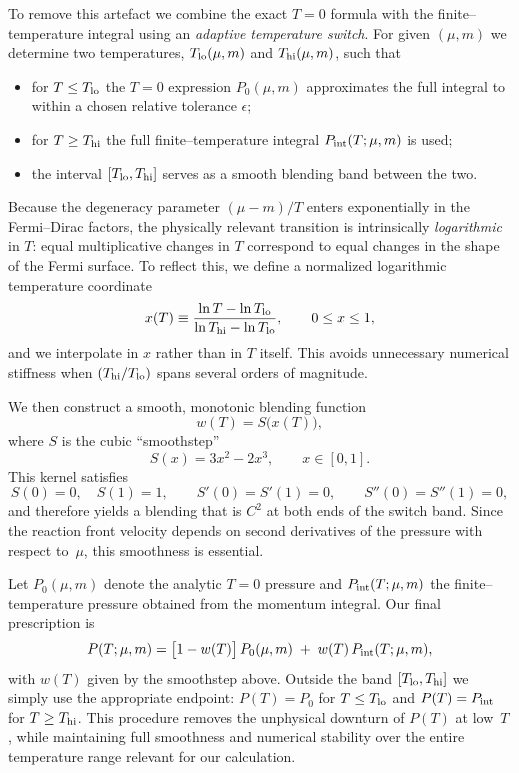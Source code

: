 \documentclass[superscriptaddress,amsmath,floatfix,aps,prc,twocolumn]{revtex4-1}
\begin{document}
To remove this artefact we combine the exact $T=0$ formula with the
finite--temperature integral using an \emph{adaptive temperature
switch}.  For given $(\mu,m)$ we determine two temperatures,
$T_{\rm lo}(\mu,m)$ and $T_{\rm hi}(\mu,m)$, such that
\begin{itemize}
  \item for $T \leq T_{\rm lo}$ the $T=0$ expression $P_0(\mu,m)$
        approximates the full integral to within a chosen relative
        tolerance $\epsilon$;
  \item for $T \geq T_{\rm hi}$ the full finite--temperature integral
        $P_{\rm int}(T;\mu,m)$ is used;
  \item the interval $[T_{\rm lo},T_{\rm hi}]$ serves as a smooth
        blending band between the two.
\end{itemize}
Because the degeneracy parameter
\(
(\mu-m)/T
\)
enters exponentially in the Fermi--Dirac factors, the physically
relevant transition is intrinsically \emph{logarithmic} in $T$: equal
multiplicative changes in $T$ correspond to equal changes in the shape
of the Fermi surface. To reflect this, we define a normalized
logarithmic temperature coordinate
\begin{equation}
  x(T)
  \equiv
  \frac{\ln T - \ln T_{\rm lo}}
       {\ln T_{\rm hi}-\ln T_{\rm lo}},
  \qquad 0 \le x \le 1,
\end{equation}
and we interpolate in $x$ rather than in $T$ itself. This avoids
unnecessary numerical stiffness when $(T_{\rm hi}/T_{\rm lo})$ spans
several orders of magnitude.

We then construct a smooth, monotonic blending function
\begin{equation}
  w(T) = S\!\bigl(x(T)\bigr),
\end{equation}
where $S$ is the cubic ``smoothstep''
\begin{equation}
  S(x) = 3x^{2} - 2x^{3}, \qquad x\in[0,1].
\end{equation}
This kernel satisfies
\begin{equation}
  S(0)=0,\quad S(1)=1,\qquad
  S'(0)=S'(1)=0,\qquad
  S''(0)=S''(1)=0,
\end{equation}
and therefore yields a blending that is $C^2$ at both ends of the
switch band. Since the reaction front velocity depends on second
derivatives of the pressure with respect to~$\mu$, this smoothness is
essential.

Let $P_0(\mu,m)$ denote the analytic $T=0$ pressure and
$P_{\rm int}(T;\mu,m)$ the finite--temperature pressure obtained from
the momentum integral. Our final prescription is
\begin{equation}
  P(T;\mu,m)
  =
  \bigl[1-w(T)\bigr]\,P_0(\mu,m)
  \;+\;
  w(T)\,P_{\rm int}(T;\mu,m) ,
\end{equation}
with $w(T)$ given by the smoothstep above. Outside the band
$[T_{\rm lo},T_{\rm hi}]$ we simply use the appropriate endpoint:
$P(T)=P_0$ for $T\leq T_{\rm lo}$ and $P(T)=P_{\rm int}$ for
$T\geq T_{\rm hi}$. This procedure removes the unphysical downturn of
$P(T)$ at low~$T$, while maintaining full smoothness and numerical
stability over the entire temperature range relevant for our calculation.
\end{document}
